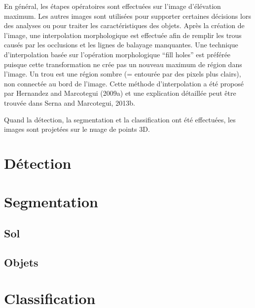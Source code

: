 \vspace{1em}

En général, les étapes opératoires sont effectuées sur l’image d’élévation maximum. Les autres images sont utilisées pour supporter certaines décisions lors des analyses ou pour traiter les caractéristiques des objets.
Après la création de l’image, une interpolation morphologique est effectuée afin de remplir les trous causés par les occlusions et les lignes de balayage manquantes. Une technique d’interpolation basée sur l’opération morphologique \enquote{fill holes} est préférée puisque cette transformation ne crée pas un nouveau maximum de région dans l’image. Un trou est une région sombre (= entourée par des pixels plus clairs), non connectée au bord de l’image. Cette méthode d’interpolation a été proposé par Hernandez and Marcotegui (2009a) et une explication détaillée peut être trouvée dans Serna and Marcotegui, 2013b.

Quand la détection, la segmentation et la classification ont été effectuées, les images sont projetées sur le nuage de points 3D. 

\section{Détection}

\section{Segmentation}
\subsection{Sol}
\subsection{Objets}


\section{Classification}